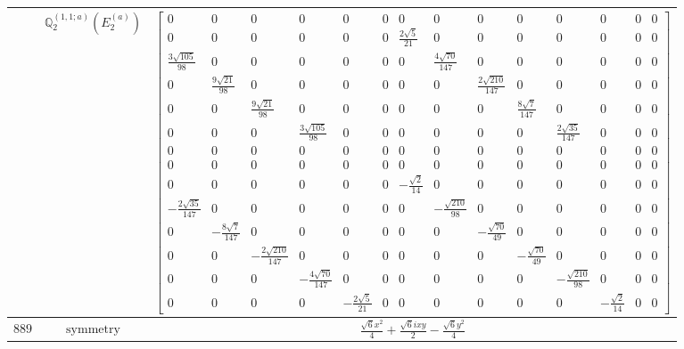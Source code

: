 \documentclass[fleqn,8pt,landscape]{jsarticle}
\begin{document}
\begin{longtable}{ccc}
$  $ & $ \mathbb{Q}_{2}^{(1,1;a)}(E_{2}^{(a)}) $ & $ \begin{bmatrix} 0 & 0 & 0 & 0 & 0 & 0 & 0 & 0 & 0 & 0 & 0 & 0 & 0 & 0 \\ 0 & 0 & 0 & 0 & 0 & 0 & \frac{2 \sqrt{5}}{21} & 0 & 0 & 0 & 0 & 0 & 0 & 0 \\ \frac{3 \sqrt{105}}{98} & 0 & 0 & 0 & 0 & 0 & 0 & \frac{4 \sqrt{70}}{147} & 0 & 0 & 0 & 0 & 0 & 0 \\ 0 & \frac{9 \sqrt{21}}{98} & 0 & 0 & 0 & 0 & 0 & 0 & \frac{2 \sqrt{210}}{147} & 0 & 0 & 0 & 0 & 0 \\ 0 & 0 & \frac{9 \sqrt{21}}{98} & 0 & 0 & 0 & 0 & 0 & 0 & \frac{8 \sqrt{7}}{147} & 0 & 0 & 0 & 0 \\ 0 & 0 & 0 & \frac{3 \sqrt{105}}{98} & 0 & 0 & 0 & 0 & 0 & 0 & \frac{2 \sqrt{35}}{147} & 0 & 0 & 0 \\ 0 & 0 & 0 & 0 & 0 & 0 & 0 & 0 & 0 & 0 & 0 & 0 & 0 & 0 \\ 0 & 0 & 0 & 0 & 0 & 0 & 0 & 0 & 0 & 0 & 0 & 0 & 0 & 0 \\ 0 & 0 & 0 & 0 & 0 & 0 & - \frac{\sqrt{2}}{14} & 0 & 0 & 0 & 0 & 0 & 0 & 0 \\ - \frac{2 \sqrt{35}}{147} & 0 & 0 & 0 & 0 & 0 & 0 & - \frac{\sqrt{210}}{98} & 0 & 0 & 0 & 0 & 0 & 0 \\ 0 & - \frac{8 \sqrt{7}}{147} & 0 & 0 & 0 & 0 & 0 & 0 & - \frac{\sqrt{70}}{49} & 0 & 0 & 0 & 0 & 0 \\ 0 & 0 & - \frac{2 \sqrt{210}}{147} & 0 & 0 & 0 & 0 & 0 & 0 & - \frac{\sqrt{70}}{49} & 0 & 0 & 0 & 0 \\ 0 & 0 & 0 & - \frac{4 \sqrt{70}}{147} & 0 & 0 & 0 & 0 & 0 & 0 & - \frac{\sqrt{210}}{98} & 0 & 0 & 0 \\ 0 & 0 & 0 & 0 & - \frac{2 \sqrt{5}}{21} & 0 & 0 & 0 & 0 & 0 & 0 & - \frac{\sqrt{2}}{14} & 0 & 0 \end{bmatrix} $ \\ \hline
$ 889 $ & $ \text{symmetry} $ & $ \frac{\sqrt{6} x^{2}}{4} + \frac{\sqrt{6} i x y}{2} - \frac{\sqrt{6} y^{2}}{4} $ \\

\end{longtable}
\end{document}
